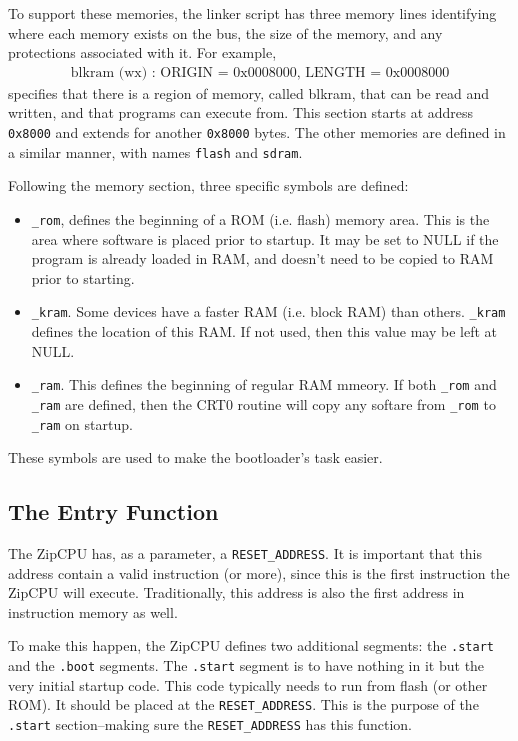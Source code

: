 \documentclass{gqtekspec}
\begin{document}
To support these memories, the linker script has three memory lines identifying
where each memory exists on the bus, the size of the memory, and any protections
associated with it.  For example,
\begin{eqnarray*}
\mbox{blkram (wx) : ORIGIN = 0x0008000, LENGTH = 0x0008000}
\end{eqnarray*}
specifies that there is a region of memory, called blkram, that can be read and
written, and that programs can execute from.  This section starts at address
{\tt 0x8000} and extends for another {\tt 0x8000} bytes.  The other memories
are defined in a similar manner, with names {\tt flash} and {\tt sdram}.

Following the memory section, three specific symbols are defined:
\begin{itemize}
\item {\tt \_rom}, defines the beginning of a ROM (i.e. flash) memory area.
	This is the area where software is placed prior to startup.
	It may be set to NULL if the program is already loaded in RAM, and
	doesn't need to be copied to RAM prior to starting.

\item {\tt \_kram}.  Some devices have a faster RAM (i.e. block RAM) than
	others.  {\tt \_kram} defines the location of this RAM.  If not used,
	then this value may be left at NULL.

\item {\tt \_ram}.  This defines the beginning of regular RAM mmeory.
	If both {\tt \_rom} and {\tt \_ram} are defined, then the CRT0
	routine will copy any softare from {\tt \_rom} to {\tt \_ram} on
	startup.
\end{itemize}

These symbols are used to make the bootloader's task easier.
\subsection{The Entry Function}\label{sec:ld-entry}
The ZipCPU has, as a parameter, a {\tt RESET\_ADDRESS}.  It is important
that this address contain a valid instruction (or more), since this is the
first instruction the ZipCPU will execute.  Traditionally, this address is also
the first address in instruction memory as well.

To make this happen, the ZipCPU defines two additional segments: the
{\tt .start} and the {\tt .boot} segments.  The {\tt  .start} segment is to 
have nothing in it but the very initial startup code.  This code typically
needs to run from flash (or other ROM).  It should be placed at the
{\tt RESET\_ADDRESS}.  This is the purpose of the {\tt .start} section--making
sure the {\tt RESET\_ADDRESS} has this function.
\end{document}
